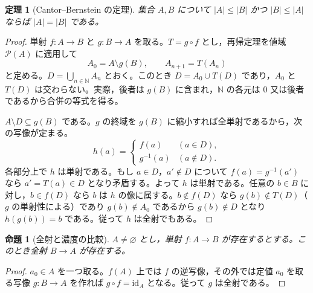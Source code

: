 \documentclass[a5paper,10pt,dvipdfmx]{jsarticle}
\theoremstyle{definition}
\theoremstyle{plain}
\newtheorem{prop}[ruledef]{命題}
\newtheorem{thm}[ruledef]{定理}
\newcommand{\Pow}{\mathcal{P}}
\newcommand{\id}{\mathrm{id}}
\begin{document}
\begin{thm}[Cantor--Bernstein の定理]\label{k135}
集合 $A,B$ について $|A|\leq |B|$ かつ $|B|\leq |A|$ ならば $|A|=|B|$ である。
\end{thm}
\begin{proof}
単射 $f\colon A\to B$ と $g\colon B\to A$ を取る。$T=g\circ f$ とし，再帰定理を値域 $\Pow(A)$ に適用して
\[ A_0=A\setminus g(B),\qquad A_{n+1}=T(A_n) \]
と定める。$D=\bigcup_{n\in\mathbb N}A_n$ とおく。このとき $D=A_0\cup T(D)$ であり，$A_0$ と $T(D)$ は交わらない。実際，後者は $g(B)$ に含まれ，$\mathbb N$ の各元は $0$ 又は後者であるから合併の等式を得る。

$A\setminus D\subseteq g(B)$ である。$g$ の終域を $g(B)$ に縮小すれば全単射であるから，次の写像が定まる。
\[ h(a)=\begin{cases}f(a)&(a\in D),\\g^{-1}(a)&(a\notin D).\end{cases} \]
各部分上で $h$ は単射である。もし $a\in D$，$a'\notin D$ について $f(a)=g^{-1}(a')$ なら $a'=T(a)\in D$ となり矛盾する。よって $h$ は単射である。任意の $b\in B$ に対し，$b\in f(D)$ なら $b$ は $h$ の像に属する。$b\notin f(D)$ なら $g(b)\notin T(D)$（$g$ の単射性による）であり $g(b)\notin A_0$ であるから $g(b)\notin D$ となり $h(g(b))=b$ である。従って $h$ は全射でもある。
\end{proof}
\begin{prop}[全射と濃度の比較]\label{k136}
$A\ne\varnothing$ とし，単射 $f\colon A\to B$ が存在するとする。このとき全射 $B\to A$ が存在する。
\end{prop}
\begin{proof}
$a_0\in A$ を一つ取る。$f(A)$ 上では $f$ の逆写像，その外では定値 $a_0$ を取る写像 $g\colon B\to A$ を作れば $g\circ f=\id_A$ となる。従って $g$ は全射である。
\end{proof}
\end{document}
